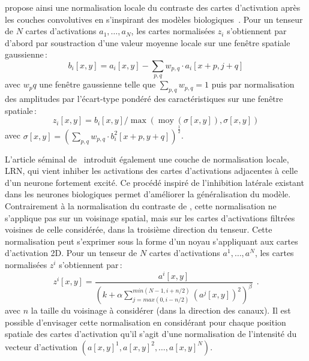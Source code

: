 \citet{jarrett_what_2009} propose ainsi une normalisation locale du contraste des cartes d'activation après les couches convolutives en s'inspirant des modèles biologiques~\cite{pinto_why_2008}. Pour un tenseur de $N$ cartes d'activations $a_1,\dots,a_N$, les cartes normalisées $z_i$ s'obtiennent par d'abord par soustraction d'une valeur moyenne locale sur une fenêtre spatiale gaussienne\,:
$$b_i[x,y] = a_i[x,y] - \sum_{p,q} w_{p,q} \cdot a_i[x+p,j+q]$$ avec $w_pq$ une fenêtre gaussienne telle que $\sum_{p,q} w_{p,q} = 1$
puis par normalisation des amplitudes par l'écart-type pondéré des caractéristiques sur une fenêtre spatiale\,:
$$z_i[x,y] = b_i[x,y] / \max(\operatorname{moy}(\sigma[x,y]), \sigma[x,y])$$ avec $\sigma[x,y] = \left(\sum_{p,q} w_{p,q} \cdot b_i^2[x+p,y+q] \right)^{\frac{1}{2}}$.

L'article séminal de~\citet{krizhevsky_imagenet_2012} introduit également une couche de normalisation locale, \gls{LRN}, qui vient inhiber les activations des cartes d'activations adjacentes à celle d'un neurone fortement excité. Ce procédé inspiré de l'inhibition latérale existant dans les neurones biologiques permet d'améliorer la généralisation du modèle. Contrairement à la normalisation du contraste de \citet{jarrett_what_2009}, cette normalisation ne s'applique pas sur un voisinage spatial, mais sur les cartes d'activations filtrées voisines de celle considérée, dans la troisième direction du tenseur. Cette normalisation peut s'exprimer sous la forme d'un noyau s'appliquant aux cartes d'activation 2D. Pour un tenseur de $N$ cartes d'activations $a^1,\dots,a^N$, les cartes normalisées $z^i$ s'obtiennent par\,:
$$z^i[x,y] = \frac{a^i[x,y]}{\left(k + \alpha \sum_{j=max(0, i-n/2)}^{min(N-1, i+n/2)} (a^j[x,y])^2  \right)^\beta}~~.$$
avec $n$ la taille du voisinage à considérer (dans la direction des canaux). Il est possible d'envisager cette normalisation en considérant pour chaque position spatiale des cartes d'activation qu'il s'agit d'une normalisation de l'intensité du vecteur d'activation $(a[x,y]^1, a[x,y]^2, \dots, a[x,y]^N)$.

